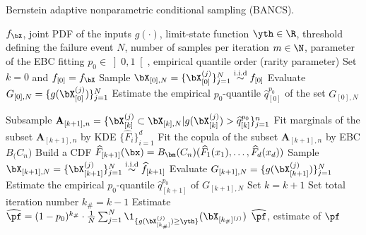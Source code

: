\begin{algorithm}[h]
\caption{Bernstein adaptive nonparametric conditional sampling (BANCS).}\label{alg:bancs}
\footnotesize
\begin{algorithmic}
\State {}
\State $f_\bX$, joint PDF of the inputs
\State $g(\cdot)$, limit-state function
\State $\yth \in \R$, threshold defining the failure event 
\State $N$, number of samples per iteration
\State $m \in \N$, parameter of the EBC fitting
\State $p_0 \in \left]0, 1\right[$, empirical quantile order (rarity parameter)
\State {}
\State Set $k = 0$ and $f_{[0]} = f_\bX$
\State Sample $\bX_{[0], N} = \{\bX_{[0]}^{(j)}\}_{j=1}^N \overset{\text{i.i.d}}{\sim} f_{[0]}$
\State Evaluate $G_{[0], N} = \{g(\bX_{[0]}^{(j)})\}_{j=1}^N$
\State Estimate the empirical $p_0$-quantile $\widehat{q}_{[0]}^{p_0}$ of the set $G_{[0], N}$

\State Subsample $\mathbf{A}_{[k+1], n}=\{\bX_{[k]}^{(j)} \subset \bX_{[k], N}| g(\bX_{[k]}^{(j)}) > \widehat{q}_{[k]}^{p_0} \}_{j=1}^n$
\State Fit marginals of the subset $\mathbf{A}_{[k+1], n}$ by KDE $\{\widehat{F}_i\}_{i=1}^d$
\State Fit the copula of the subset $\mathbf{A}_{[k+1], n}$ by EBC $B_\bm(C_n)$
\State Build a CDF $\widehat{F}_{[k+1]}(\bx) = B_\bm(C_n)(\widehat{F}_1(x_1), \dots, \widehat{F}_d(x_d))$
\State Sample $\bX_{[k+1], N} = \{\bX_{[k+1]}^{(j)}\}_{j=1}^N \overset{\text{i.i.d}}{\sim} \widehat{f}_{[k+1]}$
\State Evaluate $G_{[k+1], N} = \{g(\bX_{[k+1]}^{(j)})\}_{j=1}^N$
\State Estimate the empirical $p_0$-quantile $\widehat{q}_{[k+1]}^{p_0}$ of $G_{[k+1], N}$
\State Set $k = k+1$
\EndWhile
\State Set total iteration number $k_\# = k-1$ 
\State Estimate $\widehat{\pf} = (1 - p_0)^{k_\#} \cdot \frac{1}{N} \sum_{j=1}^N \1_{\{g(\bX_{[k_\#]}^{(j)}) \geq \yth  \}}(\bX_{[k_\#]^{(j)}}) $
\State $\widehat{\pf}$, estimate of $\pf$
\end{algorithmic}
\end{algorithm}

